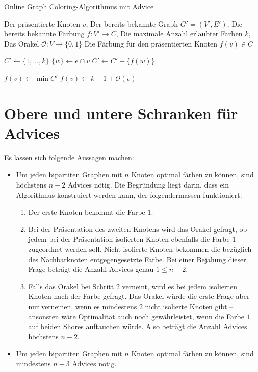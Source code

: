 \documentclass[11pt]{scrreprt} %
\theoremstyle{definition}
\begin{document}
\begin{algorithm}
\caption{Online Graph Coloring-Algorithmus mit Advice}
\label{algo.advice}
\begin{algorithmic}
\Require
	\State Der präsentierte Knoten $v$,
	\State Der bereits bekannte Graph $G' = (V', E')$,
	\State Die bereits bekannte Färbung $f : V' \rightarrow C$,
	\State Die maximale Anzahl erlaubter Farben $k$,
	\State Das Orakel $\mathcal{O} : V \rightarrow \{0,1\}$
\Ensure
	\State Die Färbung für den präsentierten Knoten $f(v) \in C$
\Statex

\State $C' \gets \{1, \dots, k\}$
	\State $\{w\} \gets e \cap v$
		\State $C' \gets C' - \{ f(w) \}$
	\EndIf
\EndFor
\EndFor

\Statex

	\State $ f(v) \gets \min C'$
\Else
	\State $ f(v) \gets k-1+\mathcal{O}(v)$
\EndIf

\end{algorithmic}
\end{algorithm}

\section{Obere und untere Schranken für Advices}

Es lassen sich folgende Aussagen machen:

\begin{itemize}
\item Um jeden bipartiten Graphen mit $n$ Knoten optimal färben zu können, sind höchstens $n-2$ Advices nötig. Die Begründung liegt darin, dass ein Algorithmus konstruiert werden kann, der folgendermassen funktioniert:

\begin{enumerate}
\item Der erste Knoten bekommt die Farbe $1$.
\item Bei der Präsentation des zweiten Knotens wird das Orakel gefragt, ob jedem bei der Präsentation isolierten Knoten ebenfalls die Farbe $1$ zugeordnet werden soll. Nicht-isolierte Knoten bekommen die bezüglich des Nachbarknoten entgegengesetzte Farbe. Bei einer Bejahung dieser Frage beträgt die Anzahl Advices genau $1 \le n-2$.
\item Falls das Orakel bei Schritt 2 verneint, wird es bei jedem isolierten Knoten nach der Farbe gefragt. Das Orakel würde die erste Frage aber nur verneinen, wenn es mindestens $2$ nicht isolierte Knoten gibt -- ansonsten wäre Optimalität auch noch gewährleistet, wenn die Farbe $1$ auf beiden Shores auftauchen würde. Also beträgt die Anzahl Advices höchstens $n-2$. \cite{bipartite}
\end{enumerate}

\item Um jeden bipartiten Graphen mit $n$ Knoten optimal färben zu können, sind mindestens $n-3$ Advices nötig. \cite{bipartite}

\end{itemize}





\listoffigures
\listofalgorithms
\end{document}
